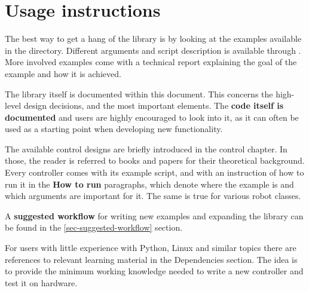 \section{Usage instructions}
The best way to get a hang of the library is by looking at
the examples available in the 
directory.
Different arguments and script description is available through 
\newline
{}.
More involved examples come with a technical report explaining the 
goal of the example and how it is achieved.

The library itself is documented within this document.
This concerns the high-level design decisions,
and the most important elements.  
The \textbf{code itself is documented} and users are highly encouraged 
to look into it, as it can often be used as a starting point
when developing new functionality.

The available control designs are briefly introduced in the control chapter.
In those, the reader is referred to books and 
papers for their theoretical background.
Every controller comes with its example script,
and with an instruction of how to run it in
the \textbf{How to run} paragraphs, which denote where
the example is and which arguments are important for it.
The same is true for various robot classes.

A \textbf{suggested workflow} for writing new examples
and expanding the library can be found in the 
\ref{sec-suggested-workflow} section.

For users with little experience with Python, Linux and similar
topics there are references to relevant learning material 
in the Dependencies section. The idea is to provide 
the minimum working knowledge needed to write
a new controller and test it on hardware.
